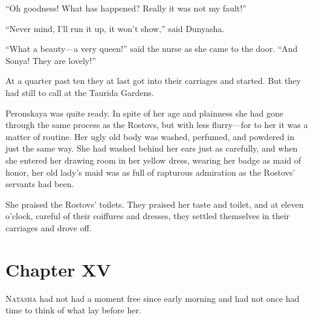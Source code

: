 ``Oh goodness! What has happened? Really it was not my fault!''

``Never mind, I'll run it up, it won't show,'' said Dunyasha.

``What a beauty---a very queen!'' said the nurse as she came to
the door.  ``And Sonya! They are lovely!''

At a quarter past ten they at last got into their carriages and
started.  But they had still to call at the Taurida Gardens.

Peronskaya was quite ready. In spite of her age and plainness she
had gone through the same process as the Rostovs, but with less
flurry---for to her it was a matter of routine. Her ugly old body
was washed, perfumed, and powdered in just the same way. She had
washed behind her ears just as carefully, and when she entered
her drawing room in her yellow dress, wearing her badge as maid
of honor, her old lady's maid was as full of rapturous admiration
as the Rostovs' servants had been.

She praised the Rostovs' toilets. They praised her taste and
toilet, and at eleven o'clock, careful of their coiffures and
dresses, they settled themselves in their carriages and drove
off.


\chapter*{Chapter XV}
\ifaudio     
{} 
\fi

\lettrine[lines=2, loversize=0.3, lraise=0]{\initfamily N}{atasha}
had not had a moment free since early morning and had not
once had time to think of what lay before her.

